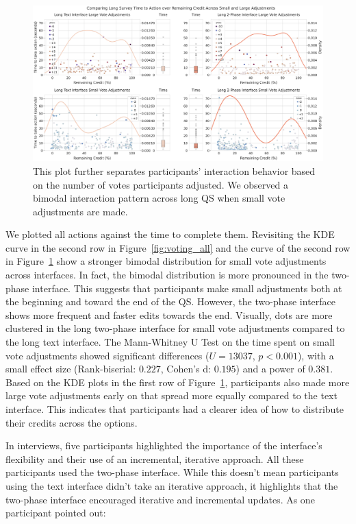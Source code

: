\begin{figure}[ht]
    \centering
    \includegraphics[width=\textwidth]{content/image/results/combined_density_plots.pdf}
    \caption{This plot further separates participants' interaction behavior based on the number of votes participants adjusted. We observed a bimodal interaction pattern across long QS when small vote adjustments are made.}
    \label{fig:voting_v3_v4}
\end{figure}

We plotted all actions against the time to complete them. Revisiting the KDE curve in the second row in Figure~\ref{fig:voting_all} and the curve of the second row in Figure~\ref{fig:voting_v3_v4} show a stronger bimodal distribution for small vote adjustments across interfaces. In fact, the bimodal distribution is more pronounced in the two-phase interface. This suggests that participants make small adjustments both at the beginning and toward the end of the QS. However, the two-phase interface shows more frequent and faster edits towards the end. Visually, dots are more clustered in the long two-phase interface for small vote adjustments compared to the long text interface. The Mann-Whitney U Test on the time spent on small vote adjustments showed significant differences ($U=13037$, $p<0.001$), with a small effect size (Rank-biserial: $0.227$, Cohen's d: $0.195$) and a power of $0.381$. Based on the KDE plots in the first row of Figure~\ref{fig:voting_v3_v4}, participants also made more large vote adjustments early on that spread more equally compared to the text interface. This indicates that participants had a clearer idea of how to distribute their credits across the options.

In interviews, five participants highlighted the importance of the interface's flexibility and their use of an incremental, iterative approach. All these participants used the two-phase interface. While this doesn't mean participants using the text interface didn't take an iterative approach, it highlights that the two-phase interface encouraged iterative and incremental updates. As one participant pointed out:

